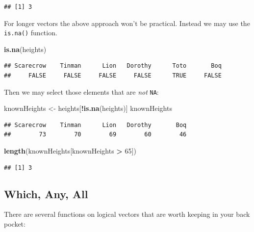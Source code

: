 \documentclass[]{book}
\makeatletter
\newenvironment{Shaded}{\begin{snugshade}}{\end{snugshade}}
\newcommand{\KeywordTok}[1]{\textcolor[rgb]{0.13,0.29,0.53}{\textbf{#1}}}
\newcommand{\DecValTok}[1]{\textcolor[rgb]{0.00,0.00,0.81}{#1}}
\newcommand{\StringTok}[1]{\textcolor[rgb]{0.31,0.60,0.02}{#1}}
\newcommand{\OperatorTok}[1]{\textcolor[rgb]{0.81,0.36,0.00}{\textbf{#1}}}
\newcommand{\NormalTok}[1]{#1}
\newenvironment{kframe}{%
\medskip{}
\setlength{\fboxsep}{.8em}
 \def\at@end@of@kframe{}%
 \ifinner\ifhmode%
  \def\at@end@of@kframe{\end{minipage}}%
  \begin{minipage}{\columnwidth}%
 \fi\fi%
 \def\FrameCommand##1{\hskip\@totalleftmargin \hskip-\fboxsep
 \colorbox{shadecolor}{##1}\hskip-\fboxsep
     \hskip-\linewidth \hskip-\@totalleftmargin \hskip\columnwidth}%
 \MakeFramed {\advance\hsize-\width
   \@totalleftmargin\z@ \linewidth\hsize
   \@setminipage}}%
 {\par\unskip\endMakeFramed%
 \at@end@of@kframe}
\renewenvironment{Shaded}{\begin{kframe}}{\end{kframe}}
\theoremstyle{definition}
\theoremstyle{definition}
\theoremstyle{definition}
\theoremstyle{remark}
\makeatother
\begin{document}
\begin{verbatim}
## [1] 3
\end{verbatim}

For longer vectors the above approach won't be practical. Instead we may
use the \texttt{is.na()} function.

\begin{Shaded}
\begin{Highlighting}[]
\KeywordTok{is.na}\NormalTok{(heights)}
\end{Highlighting}
\end{Shaded}

\begin{verbatim}
## Scarecrow    Tinman      Lion   Dorothy      Toto       Boq 
##     FALSE     FALSE     FALSE     FALSE      TRUE     FALSE
\end{verbatim}

Then we may select those elements that are \emph{not} \texttt{NA}:

\begin{Shaded}
\begin{Highlighting}[]
\NormalTok{knownHeights <-}\StringTok{ }\NormalTok{heights[}\OperatorTok{!}\KeywordTok{is.na}\NormalTok{(heights)]}
\NormalTok{knownHeights}
\end{Highlighting}
\end{Shaded}

\begin{verbatim}
## Scarecrow    Tinman      Lion   Dorothy       Boq 
##        73        70        69        60        46
\end{verbatim}

\begin{Shaded}
\begin{Highlighting}[]
\KeywordTok{length}\NormalTok{(knownHeights[knownHeights }\OperatorTok{>}\StringTok{ }\DecValTok{65}\NormalTok{])}
\end{Highlighting}
\end{Shaded}

\begin{verbatim}
## [1] 3
\end{verbatim}

\subsection{Which, Any, All}\label{which-any-all}

There are several functions on logical vectors that are worth keeping in
your back pocket:
\end{document}
